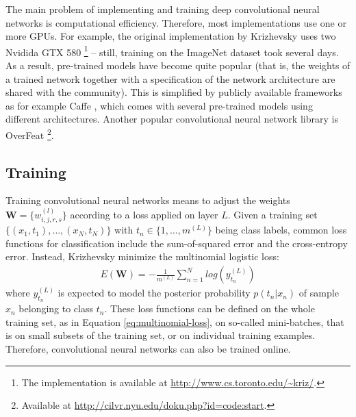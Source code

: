 The main problem of implementing and training deep convolutional neural networks is computational efficiency. Therefore, most implementations use one or more GPUs. For example, the original implementation by Krizhevsky \etal uses two Nvidida GTX 580
\footnote{
    The implementation is available at \url{http://www.cs.toronto.edu/~kriz/}.
} -- still, training on the ImageNet dataset \cite{DengDongSocherLiLiLi:2009} took several days. As a result, pre-trained models have become quite popular (that is, the weights of a trained network together with a specification of the network architecture are shared with the community).
This is simplified by publicly available frameworks as for example Caffe \cite{JiaShelhamerDonahueKarayevLongGirshickGuadarramaDarrell:2014}, which comes with several pre-trained models using different architectures.
Another popular convolutional neural network library is OverFeat
\footnote{
    Available at \url{http://cilvr.nyu.edu/doku.php?id=code:start}.
}.

\subsection{Training}
\label{subsec:training}

Training convolutional neural networks means to adjust the weights $\mathbf{W} = \{w_{i,j,r,s}^{(l)}\}$ according to a loss applied on layer $L$. Given a training set $\{(x_1,t_1),\ldots,(x_N,t_N)\}$ with $t_n \in \{1,\ldots,m^{(L)}\}$ being class labels, common loss functions for classification include the sum-of-squared error and the cross-entropy error.
Instead, Krizhevsky \etal minimize the multinomial logistic loss:
\begin{align}
    E(\mathbf{W}) = - \frac{1}{m^{(L)}} \sum_{n = 1}^{N} log\left(y_{t_n}^{(L)}\right)\label{eq:multinomial-loss}
\end{align}
where $y_{t_n}^{(L)}$ is expected to model the posterior probability $p(t_n | x_n)$ of sample $x_n$ belonging to class $t_n$. These loss functions can be defined on the whole training set, as in Equation \eqref{eq:multinomial-loss}, on so-called mini-batches, that is on small subsets of the training set, or on individual training examples. Therefore, convolutional neural networks can also be trained online.

